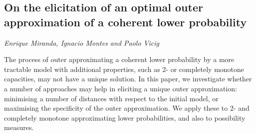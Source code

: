 \documentclass[../booklet.tex]{subfiles}
\begin{document}
\subsection[On the elicitation of an optimal outer approximation of a coherent lower probability. {\it Enrique Miranda, Ignacio Montes and Paolo Vicig}]{On the elicitation of an optimal outer approximation of a coherent lower probability}
  

\begin{center}
  {\it Enrique Miranda, Ignacio Montes and Paolo Vicig}
\end{center}



The process of outer approximating a coherent lower probability by a more tractable model with additional properties, such as 2- or completely monotone capacities, may not have a unique solution. In this paper, we investigate whether a number of approaches may help in eliciting a unique outer approximation: minimising a number of distances with respect to the initial model, or maximising the specificity of the outer approximation. We apply these to 2- and completely monotone approximating lower probabilities, and also to possibility measures.

\end{document}
